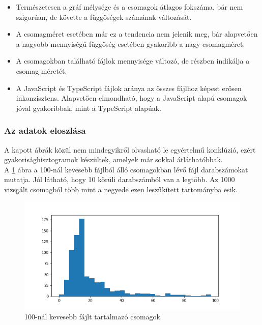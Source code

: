 \begin{itemize}
	\item Természetesen a gráf mélysége és a csomagok átlagos fokszáma, bár nem szigorúan, de követte a függőségek számának változását.
	\item A csomagméret esetében már ez a tendencia nem jelenik meg, bár alapvetően a nagyobb mennyiségű függőség esetében gyakoribb a nagy csomagméret.
	\item A csomagokban található fájlok mennyisége változó, de részben indikálja a csomag méretét.
	\item A JavaScript és TypeScript fájlok aránya az összes fájlhoz képest erősen inkonzisztens. Alapvetően elmondható, hogy a JavaScript alapú csomagok jóval gyakoribbak, mint a TypeScript alapúak.
\end{itemize}

\subsubsection{Az adatok eloszlása}

A kapott ábrák közül nem mindegyikről olvasható le egyértelmű konklúzió, ezért gyakorisághisztogramok készültek, amelyek már sokkal átláthatóbbak.\\

A \ref{fig:hist_1} ábra a 100-nál kevesebb fájlból álló csomagokban lévő fájl darabszámokat mutatja. Jól látható, hogy 10 körüli darabszámból van a legtöbb. Az 1000 vizsgált csomagból több mint a negyede ezen leszűkített tartományba esik.

\pagebreak

\begin{figure}[!h]
	\centering
	\includegraphics[scale=0.7]{images/hist_1.png}
	\caption{100-nál kevesebb fájlt tartalmazó csomagok}
	\label{fig:hist_1}
\end{figure}

